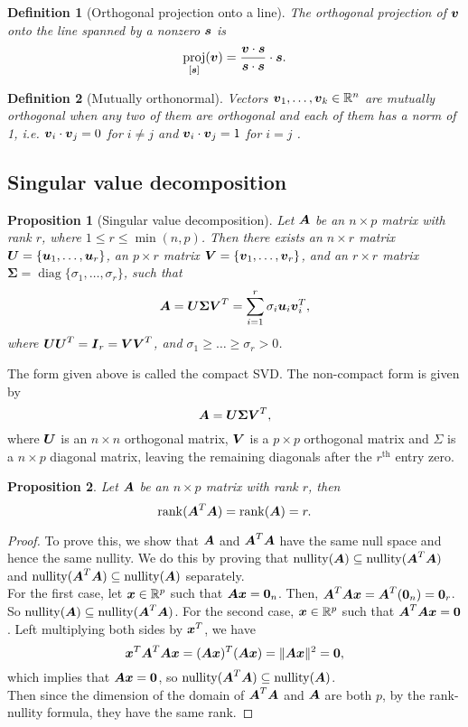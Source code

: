 \documentclass[12pt]{article}
\newtheorem{prop}{Proposition}[section]
\newtheorem{dfn}{Definition}[section]
\DeclareMathOperator{\proj}{proj}
\DeclareMathOperator{\rank}{rank}
\DeclareMathOperator{\nul}{nullity}
\DeclareMathOperator{\diag}{diag}
\newcommand{\Sg}{\Sigma}
\begin{document}
	\vspace{1mm}
	\begin{dfn}[Orthogonal projection onto a line]
		The orthogonal projection of $\boldsymbol{v}$ onto the line spanned by a nonzero $\boldsymbol{s}$ is 
		$$\proj_{[\bms]}(\bmv)=\frac{\bmv\cdot\bms}{\bms\cdot\bms}\cdot\bms.$$
	\end{dfn}
	\vspace{1mm}
	\begin{dfn}[Mutually orthonormal]
		Vectors $\bmv_1,\ldots,\bmv_k\in\Rn$ are mutually orthogonal when any two of them are orthogonal and each of them has a norm of 1, i.e. $\boldsymbol{v}_i\cdot\boldsymbol{v}_j=0$ for $i\neq j$ and $\boldsymbol{v}_i\cdot\boldsymbol{v}_j=1$ for $i= j$ .
	\end{dfn}
	\pagebreak
	\subsection{Singular value decomposition}
	\begin{prop}[Singular value decomposition]
		Let $\boldsymbol{A}$ be an $n\times p$ matrix with rank $r$, where $1\leq r\leq \min(n,p)$. Then there exists an $n\times r$ matrix $\boldsymbol{U}=\{\boldsymbol{u}_1,\ldots,\boldsymbol{u}_r\}$, an $p\times r$ matrix $\boldsymbol{V}=\{\boldsymbol{v}_1,\ldots,\boldsymbol{v}_r\}$, and an $r\times r$ matrix $\boldsymbol{\Sg}=\diag\{\sigma_1,\ldots,\sigma_r\}$, such that
		$$\bmA=\bmU\boldsymbol{\Sg}\bmV^T=\sum_{i=1}^{r}\sigma_i\bmu_i\bmv_i^T,$$
		where $\boldsymbol{U}\boldsymbol{U}^T=\boldsymbol{I}_r=\boldsymbol{V}\boldsymbol{V}^T$, and $\sigma_1\geq\ldots\geq\sigma_r>0$.
	\end{prop}
	
	The form given above is called the compact SVD. The non-compact form is given by
	$$\bmA=\bmU\boldsymbol{\Sg}\bmV^T,$$
	where $\boldsymbol{U}$ is an $n\times n$ orthogonal matrix, $\boldsymbol{V}$ is a $p\times p$ orthogonal matrix and $\Sg$ is a $n\times p$ diagonal matrix, leaving the remaining diagonals after the $r^{\text{th}}$ entry zero.

	\begin{prop}
		Let $\boldsymbol{A}$ be an $n\times p$ matrix with rank $r$, then 
		$$\rank(\bmA^T\bmA)=\rank(\bmA)=r.$$
	\end{prop}
	
	\begin{proof}
		To prove this, we show that $\boldsymbol{A}$ and $\boldsymbol{A}^T\boldsymbol{A}$ have the same null space and hence the same nullity. We do this by proving that $\nul(\bmA)\subseteq\nul(\bmA^T\bmA)$ and $\nul(\bmA^T\bmA)\subseteq\nul(\bmA)$ separately.\\
		
		For the first case, let $\bmx\in\RR^p$ such that $\boldsymbol{A}\boldsymbol{x}=\textbf{0}_n$. Then, $\boldsymbol{A}^T\boldsymbol{A}\boldsymbol{x}=\boldsymbol{A}^T(\textbf{0}_n)=\textbf{0}_r$. So $\nul(\bmA)\subseteq\nul(\bmA^T\bmA)$. For the second case, $\bmx\in\RR^p$ such that $\boldsymbol{A}^T\boldsymbol{A}\boldsymbol{x}=\textbf{0}$. Left multiplying both sides by $\boldsymbol{x}^T$, we have
		$$\boldsymbol{x}^T\boldsymbol{A}^T\boldsymbol{A}\boldsymbol{x}=(\boldsymbol{A}\boldsymbol{x})^T(\boldsymbol{A}\boldsymbol{x})=\|\boldsymbol{A}\boldsymbol{x}\|^2=\textbf{0},$$
		which implies that $\boldsymbol{A}\boldsymbol{x}=\textbf{0}$, so $\nul(\bmA^T\bmA)\subseteq\nul(\bmA)$.\\

		Then since the dimension of the domain of $\boldsymbol{A}^T\boldsymbol{A}$ and $\boldsymbol{A}$ are both $p$, by the rank-nullity formula, they have the same rank.
	\end{proof}
	
\end{document}
